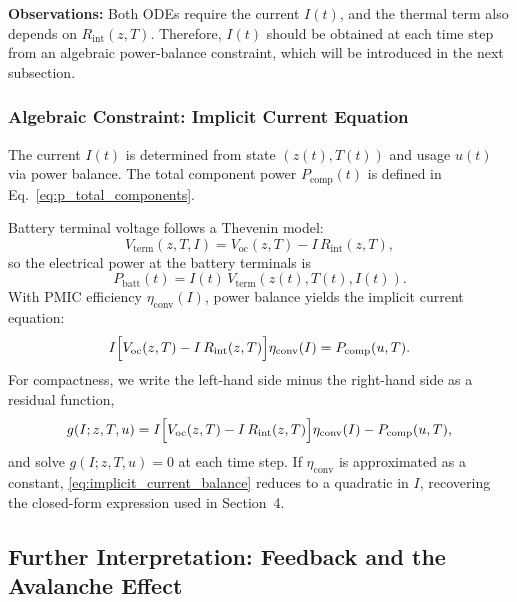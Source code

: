 \documentclass{mcmthesis}
\begin{document}
\medskip
\noindent\textbf{Observations:}
Both ODEs require the current $I(t)$, and the thermal term also depends on $R_{\mathrm{int}}(z,T)$. 
Therefore, $I(t)$ should be obtained at each time step from an algebraic power-balance constraint, which will be introduced in the next subsection.
          
\subsubsection{Algebraic Constraint: Implicit Current Equation}
\label{sec:523_implicit_current}

The current $I(t)$ is determined from state $(z(t),T(t))$ and usage $u(t)$ via power balance.
The total component power $P_{\mathrm{comp}}(t)$ is defined in Eq.~\ref{eq:p_total_components}.

Battery terminal voltage follows a Thevenin model:
\begin{equation}
V_{\mathrm{term}}(z,T,I)=V_{\mathrm{oc}}(z,T)-I\,R_{\mathrm{int}}(z,T),
\label{eq:vterm_thevenin}
\end{equation}
so the electrical power at the battery terminals is
\begin{equation}
P_{\mathrm{batt}}(t)=I(t)\,V_{\mathrm{term}}(z(t),T(t),I(t)).
\label{eq:pbatt_def}
\end{equation}
With PMIC efficiency $\eta_{\mathrm{conv}}(I)$, power balance yields the implicit current equation:
\begin{equation}
I\Bigl[V_{\mathrm{oc}}(z,T)-I\,R_{\mathrm{int}}(z,T)\Bigr]\eta_{\mathrm{conv}}(I)=P_{\mathrm{comp}}(u,T).
\label{eq:implicit_current_balance}
\end{equation}
For compactness, we write the left-hand side minus the right-hand side as a residual function,
\begin{equation}
g(I;z,T,u)=I\Bigl[V_{\mathrm{oc}}(z,T)-I\,R_{\mathrm{int}}(z,T)\Bigr]\eta_{\mathrm{conv}}(I)-P_{\mathrm{comp}}(u,T),
\label{eq:g_def}
\end{equation}
and solve $g(I;z,T,u)=0$ at each time step. If $\eta_{\mathrm{conv}}$ is approximated as a constant, \eqref{eq:implicit_current_balance} reduces to a quadratic in $I$, recovering the closed-form expression used in Section~4.

             
\subsection{Further Interpretation: Feedback and the Avalanche Effect}
\label{sec:feedback_avalanche}
\end{document}
